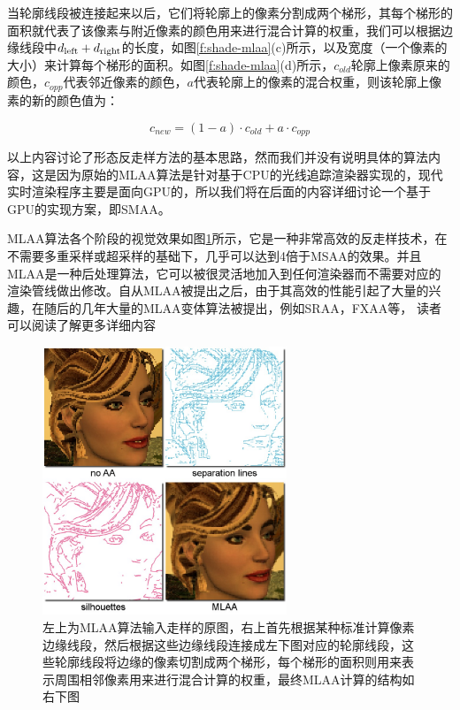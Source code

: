 当轮廓线段被连接起来以后，它们将轮廓上的像素分割成两个梯形，其每个梯形的面积就代表了该像素与附近像素的颜色用来进行混合计算的权重，我们可以根据边缘线段中$d_{\rm left}+d_{\rm right}$的长度，如图\ref{f:shade-mlaa}(c)所示，以及宽度（一个像素的大小）来计算每个梯形的面积。如图\ref{f:shade-mlaa}(d)所示，$c_{old}$轮廓上像素原来的颜色，$c_{opp}$代表邻近像素的颜色，$a$代表轮廓上的像素的混合权重，则该轮廓上像素的新的颜色值为：

\begin{equation}
	c_{new}=(1-a)\cdot c_{old}+a\cdot c_{opp}
\end{equation}

以上内容讨论了形态反走样方法的基本思路，然而我们并没有说明具体的算法内容，这是因为原始的MLAA算法是针对基于CPU的光线追踪渲染器实现的，现代实时渲染程序主要是面向GPU的，所以我们将在后面的内容详细讨论一个基于GPU的实现方案，即SMAA。

MLAA算法各个阶段的视觉效果如图\ref{f:shade-mlaa-1}所示，它是一种非常高效的反走样技术，在不需要多重采样或超采样的基础下，几乎可以达到4倍于MSAA的效果。并且MLAA是一种后处理算法，它可以被很灵活地加入到任何渲染器而不需要对应的渲染管线做出修改。自从MLAA被提出之后，由于其高效的性能引起了大量的兴趣，在随后的几年大量的MLAA变体算法被提出，例如SRAA\cite{a:SubpixelReconstructionAntialiasingforDeferredShading}，FXAA\cite{a:FXAA}等， 读者可以阅读\cite{a:FilteringApproachesforReal-TimeAnti-Aliasing}了解更多详细内容

\begin{figure}
\sidecaption
	\includegraphics[width=0.65\textwidth]{figures/shade/mlaa-1}
	\caption{左上为MLAA算法输入走样的原图，右上首先根据某种标准计算像素边缘线段，然后根据这些边缘线段连接成左下图对应的轮廓线段，这些轮廓线段将边缘的像素切割成两个梯形，每个梯形的面积则用来表示周围相邻像素用来进行混合计算的权重，最终MLAA计算的结构如右下图}
	\label{f:shade-mlaa-1}
\end{figure}

